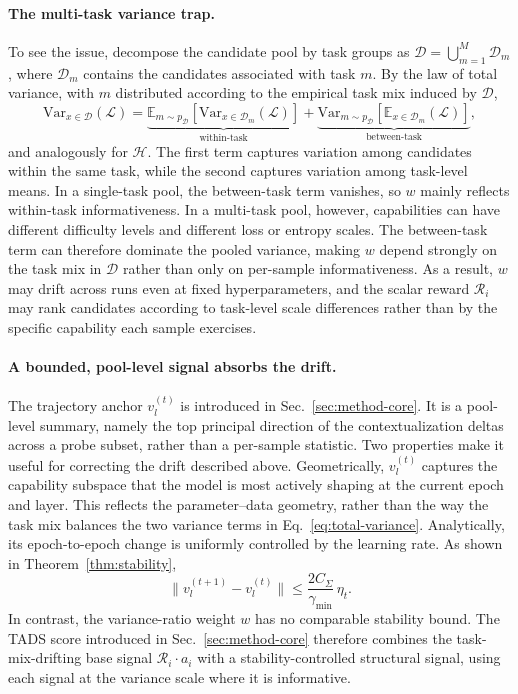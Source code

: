 \paragraph{The multi-task variance trap.}
To see the issue, decompose the candidate pool by task groups as
$\mathcal{D}=\bigcup_{m=1}^M \mathcal{D}_m$, where
$\mathcal{D}_m$ contains the candidates associated with task $m$.
By the law of total variance, with $m$ distributed according to the
empirical task mix induced by $\mathcal{D}$,
\begin{equation}
  \mathrm{Var}_{x \in \mathcal{D}}(\mathcal{L})
  =
  \underbrace{
  \mathbb{E}_{m \sim p_{\mathcal{D}}}
  \!\left[
    \mathrm{Var}_{x \in \mathcal{D}_m}(\mathcal{L})
  \right]
  }_{\text{within-task}}
  +
  \underbrace{
  \mathrm{Var}_{m \sim p_{\mathcal{D}}}
  \!\left[
    \mathbb{E}_{x \in \mathcal{D}_m}(\mathcal{L})
  \right]
  }_{\text{between-task}} ,
  \label{eq:total-variance}
\end{equation}
and analogously for $\mathcal{H}$. The first term captures
variation among candidates within the same task, while the second
captures variation among task-level means. In a single-task pool,
the between-task term vanishes, so $w$ mainly reflects within-task
informativeness. In a multi-task pool, however, capabilities can
have different difficulty levels and different loss or entropy
scales. The between-task term can therefore dominate the pooled
variance, making $w$ depend strongly on the task mix in
$\mathcal{D}$ rather than only on per-sample informativeness. As a
result, $w$ may drift across runs even at fixed hyperparameters, and
the scalar reward $\mathcal{R}_i$ may rank candidates according to
task-level scale differences rather than by the specific capability
each sample exercises.



\paragraph{A bounded, pool-level signal absorbs the drift.}
The trajectory anchor $v_l^{(t)}$ is introduced in
Sec.~\ref{sec:method-core}. It is a pool-level summary, namely the
top principal direction of the contextualization deltas across a
probe subset, rather than a per-sample statistic. Two properties make
it useful for correcting the drift described above. Geometrically,
$v_l^{(t)}$ captures the capability subspace that the model is most
actively shaping at the current epoch and layer. This reflects the
parameter--data geometry, rather than the way the task mix balances
the two variance terms in Eq.~\ref{eq:total-variance}. Analytically,
its epoch-to-epoch change is uniformly controlled by the learning
rate. As shown in Theorem~\ref{thm:stability},
\[
  \|v_l^{(t+1)} - v_l^{(t)}\|
  \le
  \frac{2 C_\Sigma}{\gamma_{\min}}\,\eta_t .
\]
In contrast, the variance-ratio weight $w$ has no comparable
stability bound. The \textsc{TADS} score introduced in
Sec.~\ref{sec:method-core} therefore combines the task-mix-drifting
base signal $\mathcal{R}_i \cdot a_i$ with a
stability-controlled structural signal, using each signal at the
variance scale where it is informative. 
 
